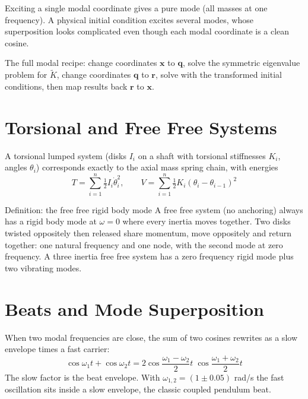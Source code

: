 \documentclass[10pt,a4paper]{article}
\begin{document}
Exciting a single modal coordinate gives a pure mode (all masses at one frequency). A physical initial condition excites several modes, whose superposition looks complicated even though each modal coordinate is a clean cosine.


The full modal recipe: change coordinates $\mathbf{x}$ to $\mathbf{q}$, solve the symmetric eigenvalue problem for $\widetilde{K}$, change coordinates $\mathbf{q}$ to $\mathbf{r}$, solve with the transformed initial conditions, then map results back $\mathbf{r}$ to $\mathbf{x}$.

\section{Torsional and Free Free Systems}
A torsional lumped system (disks $I_i$ on a shaft with torsional stiffnesses $K_i$, angles $\theta_i$) corresponds exactly to the axial mass spring chain, with energies
\begin{equation}
  T = \sum_{i=1}^{n}\tfrac{1}{2}I_i\dot{\theta}_i^2, \qquad V = \sum_{i=1}^{n}\tfrac{1}{2}K_i(\theta_i - \theta_{i-1})^2
\end{equation}
\begin{varlist}
\end{varlist}


\begin{defbox}{Definition: the free free rigid body mode}
A free free system (no anchoring) always has a rigid body mode at $\omega = 0$ where every inertia moves together. Two disks twisted oppositely then released share momentum, move oppositely and return together: one natural frequency and one node, with the second mode at zero frequency. A three inertia free free system has a zero frequency rigid mode plus two vibrating modes.
\end{defbox}

\section{Beats and Mode Superposition}
When two modal frequencies are close, the sum of two cosines rewrites as a slow envelope times a fast carrier:
\begin{equation}
  \cos\omega_1 t + \cos\omega_2 t = 2\cos\frac{\omega_1 - \omega_2}{2}t\;\cos\frac{\omega_1 + \omega_2}{2}t
\end{equation}
The slow factor is the beat envelope. With $\omega_{1,2} = (1 \pm 0.05)$ rad/s the fast oscillation sits inside a slow envelope, the classic coupled pendulum beat.
\end{document}

